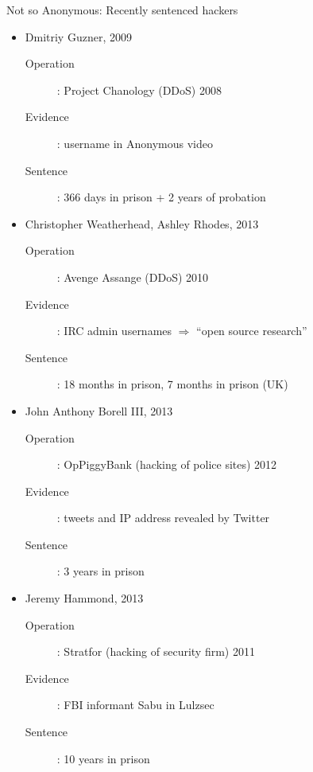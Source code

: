 \documentclass{beamer}
\begin{document}
\begin{frame}{Not so Anonymous: Recently sentenced hackers}
\begin{itemize}
\item Dmitriy Guzner, 2009
\begin{description}
\item[Operation]: Project Chanology (DDoS) 2008
\item[Evidence]: username in Anonymous video
\item[Sentence]: 366 days in prison + 2 years of probation
\end{description}
\item Christopher Weatherhead, Ashley Rhodes, 2013
\begin{description}
\item[Operation]: Avenge Assange (DDoS) 2010
\item[Evidence]: IRC admin usernames $\Rightarrow$ ``open source research''
\item[Sentence]: 18 months in prison, 7 months in prison (UK)
\end{description}
\item John Anthony Borell III, 2013
\begin{description}
\item[Operation]: OpPiggyBank (hacking of police sites) 2012
\item[Evidence]: tweets and IP address revealed by Twitter
\item[Sentence]: 3 years in prison
\end{description}
\item Jeremy Hammond, 2013 
\begin{description}
\item[Operation]: Stratfor (hacking of security firm) 2011
\item[Evidence]: FBI informant Sabu in Lulzsec
\item[Sentence]: 10 years in prison
\end{description}
\end{itemize}
\end{frame}
\end{document}
